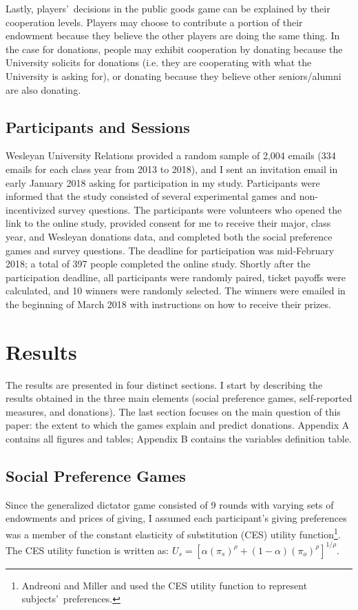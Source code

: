 \documentclass[12pt]{article}
\begin{document}
Lastly, players\rq \ decisions in the public goods game can be explained by their cooperation levels. Players may choose to contribute a portion of their endowment because they believe the other players are doing the same thing. In the case for donations, people may exhibit cooperation by donating because the University solicits for donations (i.e. they are cooperating with what the University is asking for), or donating because they believe other seniors/alumni are also donating.

	
\subsection{Participants and Sessions}

Wesleyan University Relations provided a random sample of 2,004 emails (334 emails for each class year from 2013 to 2018), and I sent an invitation email in early January 2018 asking for participation in my study. Participants were informed that the study consisted of several experimental games and non-incentivized survey questions. The participants were volunteers who opened the link to the online study, provided consent for me to receive their major, class year, and Wesleyan donations data, and completed both the social preference games and survey questions. The deadline for participation was mid-February 2018; a total of 397 people completed the online study. Shortly after the participation deadline, all participants were randomly paired, ticket payoffs were calculated, and 10 winners were randomly selected. The winners were emailed in the beginning of March 2018 with instructions on how to receive their prizes.

\section{Results}
The results are presented in four distinct sections. I start by describing the results obtained in the three main elements (social preference games, self-reported measures, and donations). The last section focuses on the main question of this paper: the extent to which the games explain and predict donations. Appendix A contains all figures and tables; Appendix B contains the variables definition table.

\subsection{Social Preference Games}
Since the generalized dictator game consisted of 9 rounds with varying sets of endowments and prices of giving, I assumed each participant\rq s giving preferences was a member of the constant elasticity of substitution (CES) utility function\footnote{Andreoni and Miller and \cite{fisman_kariv_markovits_2007} used the CES utility function to represent subjects\rq \ preferences.}.  The CES utility function is written as: \(U_{s} = [\alpha(\pi_{s})^{\rho} + (1-\alpha)(\pi_{o})^{\rho}]^{1/\rho}\).
\end{document}
